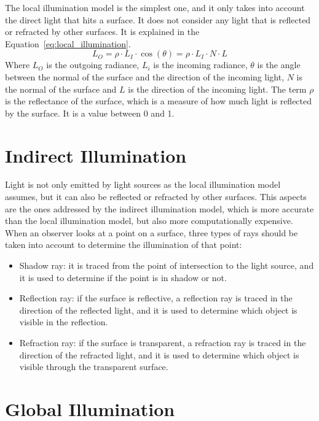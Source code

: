 The local illumination model is the simplest one, and it only takes into account the direct light that hits a surface. It does not consider any light that is reflected or refracted by other surfaces. It is explained in the Equation~\ref{eq:local_illumination}.
\begin{equation}
L_O = \rho \cdot L_I \cdot \cos(\theta) = \rho \cdot L_I \cdot N\cdot L
\label{eq:local_illumination}
\end{equation}
Where $L_O$ is the outgoing radiance, $L_i$ is the incoming radiance, $\theta$ is the angle between the normal of the surface and the direction of the incoming light, $N$ is the normal of the surface and $L$ is the direction of the incoming light. The term $\rho$ is the reflectance of the surface, which is a measure of how much light is reflected by the surface. It is a value between 0 and 1.

\section{Indirect Illumination}

Light is not only emitted by light sources as the local illumination model assumes, but it can also be reflected or refracted by other surfaces. This aspects are the ones addressed by the indirect illumination model, which is more accurate than the local illumination model, but also more computationally expensive. When an observer looks at a point on a surface, three types of rays should be taken into account to determine the illumination of that point:
\begin{itemize}
    \item Shadow ray: it is traced from the point of intersection to the light source, and it is used to determine if the point is in shadow or not.
    \item Reflection ray: if the surface is reflective, a reflection ray is traced in the direction of the reflected light, and it is used to determine which object is visible in the reflection.
    \item Refraction ray: if the surface is transparent, a refraction ray is traced in the direction of the refracted light, and it is used to determine which object is visible through the transparent surface.
\end{itemize}


\section{Global Illumination}

